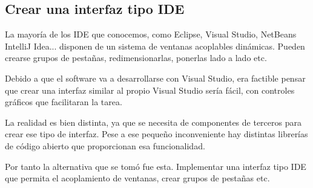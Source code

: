\subsection{Crear una interfaz tipo IDE}
La mayor\'ia de los IDE que conocemos, como Eclipse, Visual Studio, NetBeans IntelliJ Idea... disponen de un sistema de 
ventanas acoplables din\'amicas. Pueden crearse grupos de pesta\~nas, redimensionarlas, ponerlas lado a lado etc.

Debido a que el software va a desarrollarse con Visual Studio, era factible pensar que crear una interfaz similar al propio
Visual Studio ser\'ia f\'acil, con controles gr\'aficos que facilitaran la tarea.

La realidad es bien distinta, ya que se necesita de componentes de terceros para crear ese tipo de interfaz. Pese a ese
peque\~no inconveniente hay distintas librer\'ias de c\'odigo abierto que proporcionan esa funcionalidad.

Por tanto la alternativa que se tom\'o fue esta. Implementar una interfaz tipo IDE que permita el acoplamiento de ventanas,
crear grupos de pesta\~nas etc.
